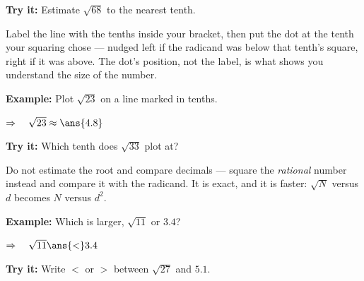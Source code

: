 \documentclass[12pt]{article}
\begin{document}
\begin{tryitbox}
\textbf{Try it:} Estimate $\sqrt{68}$ to the nearest tenth.\\[2pt]
\end{tryitbox}


\begin{formulabox}
Label the line with the tenths inside your bracket, then put the dot at the
tenth your squaring chose --- nudged left if the radicand was below that
tenth's square, right if it was above. The dot's position, not the label, is
what shows you understand the size of the number.
\end{formulabox}

\begin{examplebox}
\textbf{Example:} Plot $\sqrt{23}$ on a line marked in tenths.

$\Rightarrow\quad \sqrt{23} \approx \ans{4.8}$
\end{examplebox}

\begin{tryitbox}
\textbf{Try it:} Which tenth does $\sqrt{33}$ plot at?\\[2pt]
\end{tryitbox}


\begin{formulabox}
Do not estimate the root and compare decimals --- square the \emph{rational}
number instead and compare it with the radicand. It is exact, and it is faster:
$\sqrt{N}$ versus $d$ becomes $N$ versus $d^2$.
\end{formulabox}

\begin{examplebox}
\textbf{Example:} Which is larger, $\sqrt{11}$ or $3.4$?

$\Rightarrow\quad \sqrt{11} \ans{<} 3.4$
\end{examplebox}

\begin{tryitbox}
\textbf{Try it:} Write $<$ or $>$ between $\sqrt{27}$ and $5.1$.\\[2pt]
\end{tryitbox}
\end{document}
